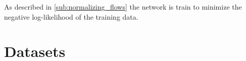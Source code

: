 As described in \autoref{sub:normalizing_flows} the network is train to
minimize the negative log-likelihood of the training data.

\section{Datasets}%
\label{sec:datasets}

\citep{cohenEMNISTExtensionMNIST2017}
\citep{anejaModelingStylizedCharacter2017a}

